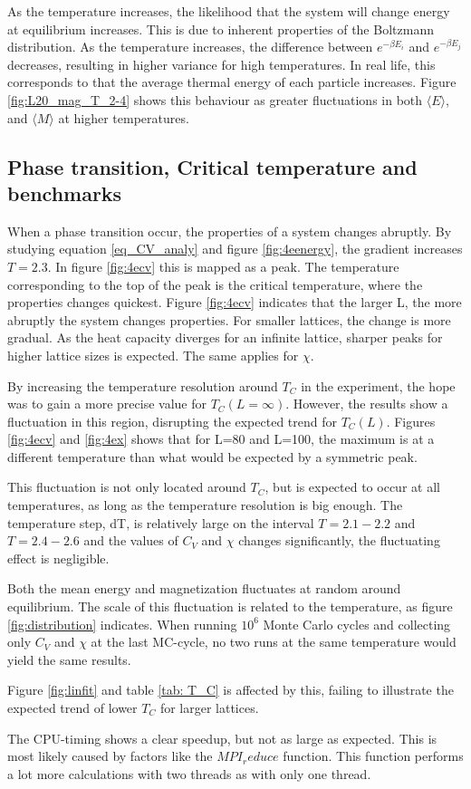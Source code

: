As the temperature increases, the likelihood that the system will change  energy at equilibrium increases. This is due to inherent properties of the Boltzmann distribution. As the temperature increases, the difference between $ e^{-\beta E_i} $ and $ e^{-\beta E_j} $ decreases, resulting in higher variance for high temperatures. In real life, this corresponds to that the average thermal energy of each particle increases. Figure \ref{fig:L20_mag_T_2-4} shows this behaviour as greater fluctuations in both $\langle E \rangle  $, and $\langle M \rangle  $ at higher temperatures. 
 

\subsection{Phase transition, Critical temperature and benchmarks}

When a phase transition occur, the properties of a system changes abruptly. By studying equation \ref{eq_CV_analy} and figure \ref{fig:4eenergy}, the gradient increases $ T = 2.3 $. In figure \ref{fig:4ecv} this is mapped as a peak. The temperature corresponding to the top of the peak is the critical temperature, where the properties changes quickest. Figure \ref{fig:4ecv} indicates that the larger L, the more abruptly the system changes properties. For smaller lattices, the change is more gradual. As the heat capacity diverges for an infinite lattice, sharper peaks for higher lattice sizes is expected. The same applies for $ \chi $. 

By increasing the temperature resolution around $ T_C $ in the experiment, the hope was to gain a more precise value for $ T_C(L = \infty) $. However, the results show a fluctuation in this region, disrupting the expected trend for $ T_C (L) $. Figures \ref{fig:4ecv} and \ref{fig:4ex} shows that for L=80 and L=100, the maximum is at a different temperature than what would be expected by a symmetric peak. 

This fluctuation is not only located around $ T_C $, but is expected to occur at all temperatures, as long as the temperature resolution is big enough. The temperature step, dT, is relatively large on the interval $ T = 2.1-2.2 $ and $ T = 2.4-2.6 $ and the values of $ C_V $ and $ \chi $ changes significantly, the fluctuating effect is negligible.

Both the mean energy and magnetization fluctuates at random around equilibrium. The scale of this fluctuation is related to the temperature, as figure \ref{fig:distribution} indicates. When running $ 10^6 $ Monte Carlo cycles and collecting only $ C_V $ and $ \chi $ at the last MC-cycle, no two runs at the same temperature would yield the same results.  
 
 Figure \ref{fig:linfit}  and table \ref{tab: T_C} is affected by this, failing to illustrate the expected trend of lower $ T_C $ for larger lattices. 
 
 
The CPU-timing shows a clear speedup, but not as large as expected. This is most likely caused by factors like the $MPI_reduce$ function. This function performs a lot more calculations with two threads as with only one thread. 
